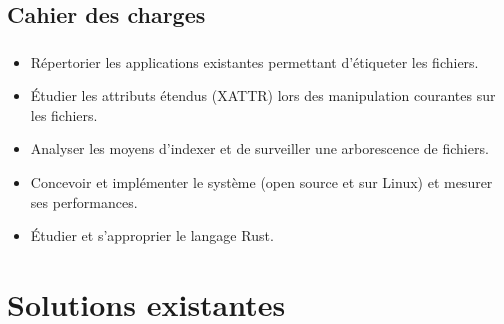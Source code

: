 \documentclass[10pt]{beamer}
\begin{document}
\subsection{Cahier des charges}
\begin{frame}
    \frametitle{\subsecname}
    \begin{itemize}
        \item Répertorier les applications existantes permettant d'étiqueter les fichiers.
        \pause
        \item Étudier les attributs étendus (XATTR) lors des manipulation courantes sur les fichiers.
        \pause
        \item Analyser les moyens d'indexer et de surveiller une arborescence de fichiers.
        \pause
        \item Concevoir et implémenter le système (open source et sur Linux) et mesurer ses performances.
        \pause
        \item Étudier et s'approprier le langage Rust.
    \end{itemize}
\end{frame}

\section{Solutions existantes}
\end{document}
